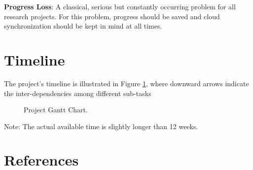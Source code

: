 \documentclass[12pt, oneside]{article}
\begin{document}
\textbf{Progress Loss}: A classical, serious but constantly occurring problem for all research projects. For this problem, progress should be saved and cloud synchronization should be kept in mind at all times.


\section{Timeline}
The project's timeline is illustrated in Figure \ref{GanntChart}, where downward arrows indicate the inter-dependencies among different sub-tasks



\begin{figure}[htbp]
    \centering
    \caption{Project Gantt Chart.}
    \label{GanntChart}
\end{figure} 

Note: The actual available time is slightly longer than 12 weeks.


\section{References}



\end{document}

